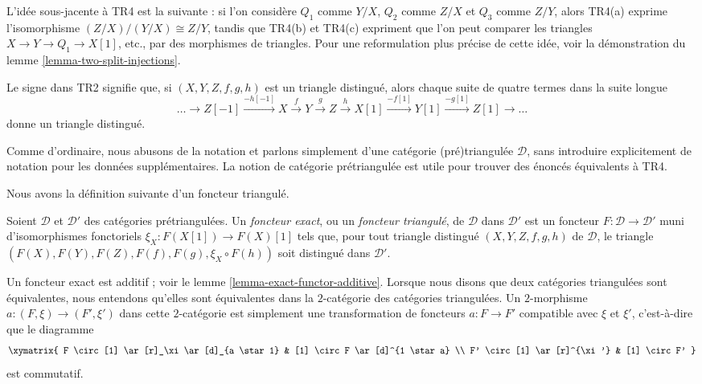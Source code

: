 \noindent
L'idée sous-jacente à TR4 est la suivante : si l'on considère $Q_1$ comme
$Y/X$, $Q_2$ comme $Z/X$ et $Q_3$ comme $Z/Y$, alors TR4(a) exprime
l'isomorphisme $(Z/X)/(Y/X) \cong Z/Y$, tandis que TR4(b) et TR4(c) expriment
que l'on peut comparer les triangles $X \to Y \to Q_1 \to X[1]$, etc.,
par des morphismes de triangles. Pour une reformulation plus précise de cette
idée, voir la démonstration du lemme \ref{lemma-two-split-injections}.

\medskip\noindent
Le signe dans TR2 signifie que, si $(X, Y, Z, f, g, h)$ est un triangle
distingué, alors chaque suite de quatre termes dans la suite longue
\begin{equation}
\label{equation-rotate}
\ldots \to
Z[-1] \xrightarrow{-h[-1]}
X \xrightarrow{f}
Y \xrightarrow{g}
Z \xrightarrow{h}
X[1] \xrightarrow{-f[1]}
Y[1] \xrightarrow{-g[1]}
Z[1] \to \ldots
\end{equation}
donne un triangle distingué.

\medskip\noindent
Comme d'ordinaire, nous abusons de la notation et parlons simplement d'une
catégorie (pré)triangulée $\mathcal{D}$, sans introduire explicitement de
notation pour les données supplémentaires. La notion de catégorie
prétriangulée est utile pour trouver des énoncés équivalents à TR4.

\medskip\noindent
Nous avons la définition suivante d'un foncteur triangulé.

\begin{definition}
\label{definition-exact-functor-triangulated-categories}
Soient $\mathcal{D}$ et $\mathcal{D}'$ des catégories prétriangulées.
Un {\it foncteur exact}, ou un {\it foncteur triangulé}, de $\mathcal{D}$
dans $\mathcal{D}'$ est un foncteur $F : \mathcal{D} \to \mathcal{D}'$
muni d'isomorphismes fonctoriels $\xi_X : F(X[1]) \to F(X)[1]$ tels que,
pour tout triangle distingué $(X, Y, Z, f, g, h)$ de $\mathcal{D}$, le triangle
$(F(X), F(Y), F(Z), F(f), F(g), \xi_X \circ F(h))$ soit distingué dans
$\mathcal{D}'$.
\end{definition}

\noindent
Un foncteur exact est additif ; voir le
lemme \ref{lemma-exact-functor-additive}.
Lorsque nous disons que deux catégories triangulées sont équivalentes, nous
entendons qu'elles sont équivalentes dans la $2$-catégorie des catégories
triangulées. Un $2$-morphisme $a : (F, \xi) \to (F', \xi')$ dans cette
$2$-catégorie est simplement une transformation de foncteurs $a : F \to F'$
compatible avec $\xi$ et $\xi'$, c'est-à-dire que le diagramme
$$
\xymatrix{
F \circ [1] \ar[r]_\xi \ar[d]_{a \star 1} & [1] \circ F \ar[d]^{1 \star a} \\
F' \circ [1] \ar[r]^{\xi'} & [1] \circ F'
}
$$
est commutatif.

